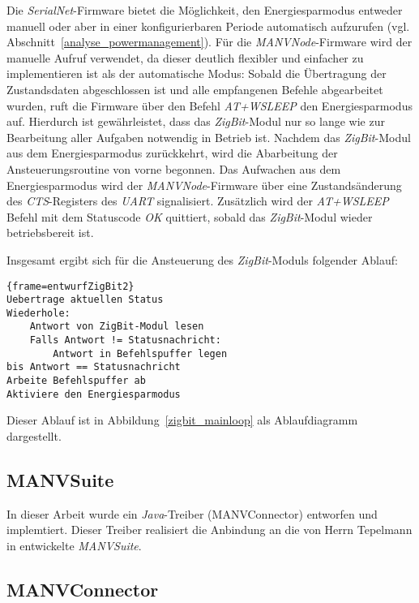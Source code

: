 Die \emph{SerialNet}-Firmware bietet die Möglichkeit, den Energiesparmodus entweder manuell oder aber in einer 
konfigurierbaren Periode automatisch aufzurufen (vgl. Abschnitt~\ref{analyse_powermanagement}). Für die
\emph{MANVNode}-Firmware wird der manuelle Aufruf verwendet, da dieser deutlich flexibler und einfacher zu
implementieren ist als der automatische Modus: Sobald die Übertragung der Zustandsdaten abgeschlossen ist und
alle empfangenen Befehle abgearbeitet wurden, ruft die Firmware über den Befehl \emph{AT+WSLEEP} den Energiesparmodus
auf. Hierdurch ist gewährleistet, dass das \emph{ZigBit}-Modul nur so lange wie zur Bearbeitung aller Aufgaben
notwendig in Betrieb ist. Nachdem das \emph{ZigBit}-Modul aus dem Energiesparmodus zurückkehrt, wird die Abarbeitung
der Ansteuerungsroutine von vorne begonnen. Das Aufwachen aus dem Energiesparmodus wird der \emph{MANVNode}-Firmware
über eine Zustandsänderung des \emph{CTS}-Registers des \emph{UART} signalisiert. Zusätzlich wird der \emph{AT+WSLEEP}
Befehl mit dem Statuscode \emph{OK} quittiert, sobald das \emph{ZigBit}-Modul wieder betriebsbereit ist. 


Insgesamt ergibt sich für die Ansteuerung des \emph{ZigBit}-Moduls folgender Ablauf:

\begin{lstlisting}{frame=entwurfZigBit2}
Uebertrage aktuellen Status
Wiederhole:
    Antwort von ZigBit-Modul lesen
    Falls Antwort != Statusnachricht:
        Antwort in Befehlspuffer legen
bis Antwort == Statusnachricht    
Arbeite Befehlspuffer ab
Aktiviere den Energiesparmodus
\end{lstlisting}

Dieser Ablauf ist in Abbildung~\ref{zigbit_mainloop} als Ablaufdiagramm dargestellt.

\subsection{MANVSuite}

In dieser Arbeit wurde ein \emph{Java}-Treiber (MANVConnector) entworfen und implemtiert. Dieser Treiber realisiert die 
Anbindung an die von Herrn Tepelmann in \cite{Jan} entwickelte \emph{MANVSuite}. 


\subsection{MANVConnector}


